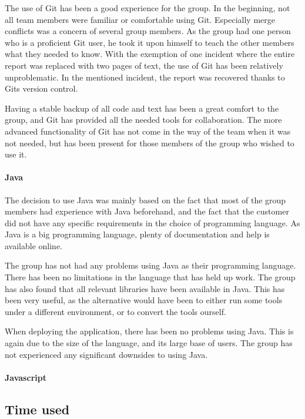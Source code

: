 \documentclass[11pt,a4paper,titlepage,oneside]{report}
\begin{document}
The use of Git has been a good experience for the group. In the beginning, not all team members were familiar or comfortable using Git. Especially merge conflicts was a concern of several group members. As the group had one person who is a proficient Git user, he took it upon himself to teach the other members what they needed to know. With the exemption of one incident where the entire report was replaced with two pages of text, the use of Git has been relatively unproblematic. In the mentioned incident, the report was recovered thanks to Gits version control. 

Having a stable backup of all code and text has been a great comfort to the group, and Git has provided all the needed tools for collaboration. The more advanced functionality of Git has not come in the way of the team when it was not needed, but has been present for those members of the group who wished to use it.

\paragraph{Java}
The decision to use Java was mainly based on the fact that most of the group members had experience with Java beforehand, and the fact that the customer did not have any specific requirements in the choice of programming language. As Java is a big programming language, plenty of documentation and help is available online. 

The group has not had any problems using Java as their programming language. There has been no limitations in the language that has held up work. The group has also found that all relevant libraries have been available in Java. This has been very useful, as the alternative would have been to either run some tools under a different environment, or to convert the tools ourself. 

When deploying the application, there has been no problems using Java. This is again due to the size of the language, and its large base of users. The group has not experienced any significant downsides to using Java. 

\paragraph{Javascript}


\subsection{Time used}
\label{subsec:TimeUsed}
\end{document}
